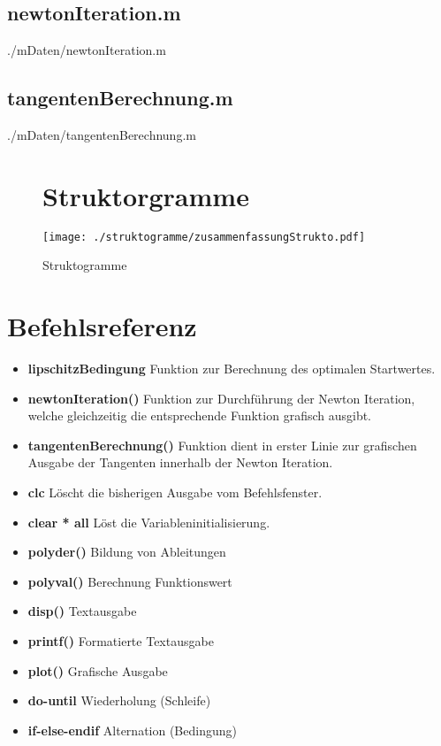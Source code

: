 \documentclass[a4paper]{scrartcl}
\begin{document}
		\subsection{newtonIteration.m}
			\lstset{language=}
			
			{./mDaten/newtonIteration.m}
			
		\subsection{tangentenBerechnung.m}
			\lstset{language=}
			
			{./mDaten/tangentenBerechnung.m}	
		
\newpage

\begin{landscape}
	\begin{figure}[ht]
	\section{Struktorgramme}
			\centering
			\texttt{[image: ./struktogramme/zusammenfassungStrukto.pdf]}
		\caption{Struktogramme}
		\end{figure}	
\end{landscape}


\section{Befehlsreferenz}
		\begin{itemize}
			\item \textbf{lipschitzBedingung}    Funktion zur Berechnung des optimalen Startwertes.
			\item \textbf{newtonIteration()}    Funktion zur Durchführung der Newton Iteration, welche gleichzeitig die entsprechende Funktion
			grafisch ausgibt.
			\item \textbf{tangentenBerechnung()}  Funktion dient in erster Linie zur grafischen Ausgabe der Tangenten innerhalb der Newton Iteration. 	
			\item \textbf{clc} Löscht die bisherigen Ausgabe vom Befehlsfenster.
			\item \textbf{clear * all} Löst die Variableninitialisierung.
			\item \textbf{polyder()} Bildung von Ableitungen
			\item \textbf{polyval()} Berechnung Funktionswert
			\item \textbf{disp()} Textausgabe
			\item \textbf{printf()} Formatierte Textausgabe
			\item \textbf{plot()} Grafische Ausgabe
			\item \textbf{do-until} Wiederholung (Schleife)
			\item \textbf{if-else-endif} Alternation (Bedingung)
		\end{itemize}	
		
\end{document}
